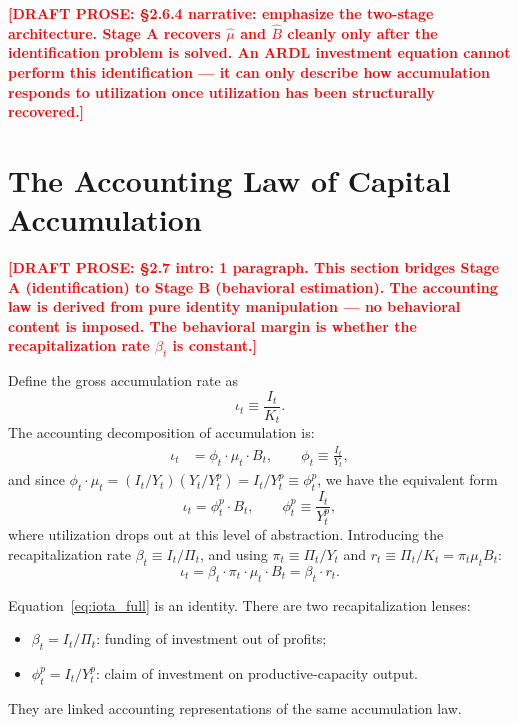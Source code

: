 \documentclass[12pt,letterpaper]{article}
\newcommand{\mut}{\mu_t}           %
\newcommand{\Yp}{Y^p_t}            %
\newcommand{\pit}{\pi_t}           %
\newcommand{\iotat}{\iota_t}       %
\newcommand{\betat}{\beta_t}       %
\newcommand{\Bt}{B_t}              %
\newcommand{\phit}{\phi_t}         %
\newcommand{\draftnote}[1]{%
  \textcolor{red}{\textbf{[DRAFT PROSE: #1]}}}
\begin{document}
\draftnote{§2.6.4 narrative: emphasize the two-stage architecture.
  Stage A recovers $\hat{\mu}$ and $\hat{B}$ cleanly only after the
  identification problem is solved. An ARDL investment equation cannot
  perform this identification — it can only describe how accumulation responds
  to utilization once utilization has been structurally recovered.}


\section{The Accounting Law of Capital Accumulation}
\label{sec:accounting}

\draftnote{§2.7 intro: 1 paragraph. This section bridges Stage A (identification)
  to Stage B (behavioral estimation). The accounting law is derived from
  pure identity manipulation — no behavioral content is imposed. The behavioral
  margin is whether the recapitalization rate $\betat$ is constant.}

Define the gross accumulation rate as
\begin{equation}
  \iotat \equiv \frac{I_t}{K_t}.
  \label{eq:iota}
\end{equation}
The accounting decomposition of accumulation is:
\begin{align}
  \iotat &= \phit \cdot \mut \cdot \Bt,
  \qquad \phit \equiv \frac{I_t}{Y_t},
  \label{eq:iota_decomp}
\end{align}
and since $\phit \cdot \mut = (I_t/Y_t)(Y_t/\Yp) = I_t/\Yp \equiv \phi^p_t$,
we have the equivalent form
\begin{equation}
  \iotat = \phi^p_t \cdot \Bt,
  \qquad
  \phi^p_t \equiv \frac{I_t}{\Yp},
  \label{eq:iota_phip}
\end{equation}
where utilization drops out at this level of abstraction.
Introducing the recapitalization rate $\betat \equiv I_t/\Pi_t$,
and using $\pit \equiv \Pi_t/Y_t$ and $r_t \equiv \Pi_t/K_t = \pit\mut\Bt$:
\begin{equation}
  \boxed{\iotat = \betat \cdot \pit \cdot \mut \cdot \Bt = \betat \cdot r_t.}
  \label{eq:iota_full}
\end{equation}

Equation~\eqref{eq:iota_full} is an identity. There are two recapitalization lenses:
\begin{itemize}
  \item $\betat = I_t/\Pi_t$: funding of investment out of profits;
  \item $\phi^p_t = I_t/\Yp$: claim of investment on productive-capacity output.
\end{itemize}
They are linked accounting representations of the same accumulation law.
\end{document}
